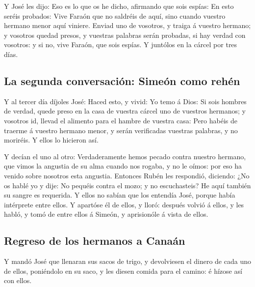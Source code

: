  Y José les dijo: Eso es lo que os he dicho, afirmando
que sois espías:  En esto seréis probados: Vive Faraón
que no saldréis de aquí, sino cuando vuestro hermano menor aquí viniere.
 Enviad uno de vosotros, y traiga á vuestro hermano; y
vosotros quedad presos, y vuestras palabras serán probadas, si hay
verdad con vosotros: y si no, vive Faraón, que sois espías.
 Y juntólos en la cárcel por tres días.

\hypertarget{la-segunda-conversaciuxf3n-simeuxf3n-como-rehuxe9n}{%
\subsection{La segunda conversación: Simeón como
rehén}\label{la-segunda-conversaciuxf3n-simeuxf3n-como-rehuxe9n}}

 Y al tercer día díjoles José: Haced esto, y vivid: Yo
temo á Dios:  Si sois hombres de verdad, quede preso en
la casa de vuestra cárcel uno de vuestros hermanos; y vosotros id,
llevad el alimento para el hambre de vuestra casa:  Pero
habéis de traerme á vuestro hermano menor, y serán verificadas vuestras
palabras, y no moriréis. Y ellos lo hicieron así.

 Y decían el uno al otro: Verdaderamente hemos pecado
contra nuestro hermano, que vimos la angustia de su alma cuando nos
rogaba, y no le oímos: por eso ha venido sobre nosotros esta angustia.
 Entonces Rubén les respondió, diciendo: ¿No os hablé yo
y dije: No pequéis contra el mozo; y no escuchasteis? He aquí también su
sangre es requerida.  Y ellos no sabían que los entendía
José, porque había intérprete entre ellos.  Y apartóse él
de ellos, y lloró: después volvió á ellos, y les habló, y tomó de entre
ellos á Simeón, y aprisionóle á vista de ellos.

\hypertarget{regreso-de-los-hermanos-a-canauxe1n}{%
\subsection{Regreso de los hermanos a
Canaán}\label{regreso-de-los-hermanos-a-canauxe1n}}

 Y mandó José que llenaran sus sacos de trigo, y
devolviesen el dinero de cada uno de ellos, poniéndolo en su saco, y les
diesen comida para el camino: é hízose así con ellos.

